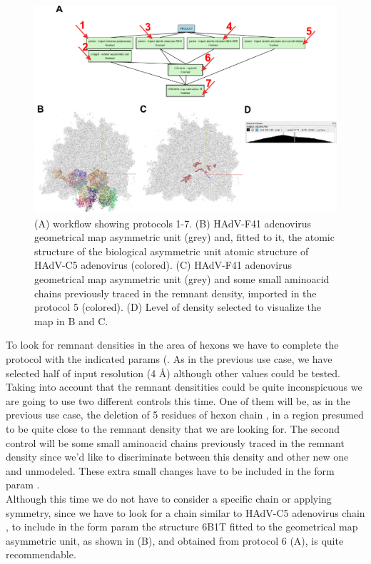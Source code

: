 \begin{itemize}
\begin{itemize}
                        \end{itemize}
                            \begin{figure}[H]
                            \centering 
                            \captionsetup{width=.9\linewidth} 
                            \includegraphics[width=.9\textwidth]{Images_appendix/Fig314.pdf}
                            \caption{(A) \scipion workflow showing protocols 1-7. (B) HAdV-F41 adenovirus geometrical map asymmetric unit (grey) and, fitted to it, the atomic structure of the biological asymmetric unit atomic structure of HAdV-C5 adenovirus (colored). (C) HAdV-F41 adenovirus geometrical map asymmetric unit (grey) and some small aminoacid chains previously traced in the remnant density, imported in the protocol 5 (colored). (D) Level of density selected to visualize the map in B and C. }  
                            \label{fig:app_usecase_mapsubtract_4}
                            \end{figure}
                         To look for remnant densities in the area of hexons we have to complete the  protocol with the indicated params (. As in the previous use case, we have selected half of input  resolution (4 \AA) although other values could be tested.\\Taking into account that the remnant densitities could be quite inconspicuous we are going to use two different controls this time. One of them will be, as in the previous use case, the deletion of 5 residues of hexon chain , in a region presumed to be quite close to the remnant density that we are looking for. The second control will be some small aminoacid chains previously traced in the remnant density since we'd like to discriminate between this density and other new one and unmodeled. These extra small changes have to be included in the form param .\\ Although this time we do not have to consider a specific chain or applying symmetry, since we have to look for a chain similar to HAdV-C5 adenovirus chain , to include in the form param  the structure 6B1T fitted to the geometrical map asymmetric unit, as shown in  (B), and obtained from protocol 6 (A), is quite recommendable. 
                            

\end{itemize}

